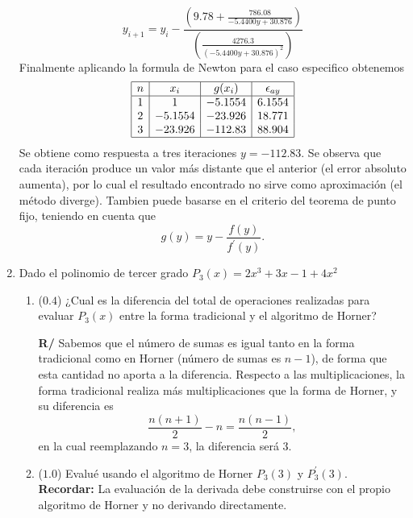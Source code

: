 \documentclass[12pt]{article}
\begin{document}
\begin{enumerate}[leftmargin=*,widest=9]
\begin{equation}
y_{i+1} = y_i - \frac{\left(9.78 + \frac{786.08}{- 5.4400 y + 30.876} \right)}{\left( \frac{4276.3}{\left(- 5.4400 y + 30.876\right)^{2}} \right)} \label{ec_newton}
\end{equation}
Finalmente aplicando la formula de Newton para el caso especifico obtenemos
\begin{equation*}
\begin{array}{|c|c|c|c|}
\hline
n & x_i & g(x_i) & \epsilon_{ay} \\
\hline
1 & 1 & -5.1554 & 6.1554 \\
2 & -5.1554 & -23.926 & 18.771\\
3 & -23.926 & -112.83 & 88.904\\
\hline
\end{array}
\end{equation*}
Se obtiene como respuesta a tres iteraciones \(y = -112.83\). Se observa que cada iteración produce un valor más distante que el anterior (el error absoluto aumenta), por lo cual el resultado encontrado no sirve como aproximación (el método diverge).
Tambien puede basarse en el criterio del teorema de punto fijo, teniendo en cuenta que \[ g(y) = y - \frac{f(y)}{f^{\prime}(y)}. \]
    \item Dado el polinomio de tercer grado \(P_3(x) = 2x^3 + 3x - 1 + 4x^2\) 
    
    \begin{enumerate}[label=\alph*]
    \item (\(0.4\)) ¿Cual es la diferencia del total de operaciones realizadas para evaluar \(P_3(x)\) entre la forma tradicional y el algoritmo de Horner?
    
   \textbf{R/} Sabemos que el número de sumas es igual tanto en la forma tradicional como en Horner (número de sumas es \(n-1\)), de forma que esta cantidad no aporta a la diferencia. Respecto a las multiplicaciones, la forma tradicional realiza más multiplicaciones que la forma de Horner, y su diferencia es
   \[ \frac{n(n+1)}{2} - n = \frac{n(n-1)}{2},\]
   en la cual reemplazando \(n= 3\), la diferencia será \(3\).
    \item (\(1.0\)) Evalué usando el algoritmo de Horner \(P_3(3)\) y \(P^\prime_3(3)\). \textbf{Recordar:} La evaluación de la derivada debe construirse con el propio algoritmo de Horner y no derivando directamente.
    

\end{enumerate}
\end{enumerate}
\end{document}
